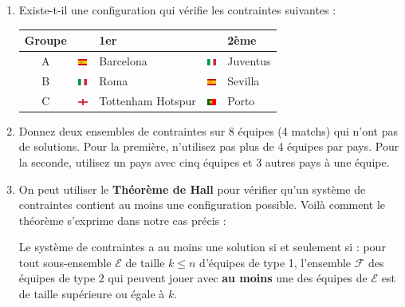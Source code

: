 \documentclass{../ficheTDTP}
\begin{document}
\begin{enumerate}
\begin{enumerate}
\begin{figure}[ht]
\end{figure}

\item Existe-t-il une configuration qui vérifie les contraintes suivantes :

\begin{tabular}{|c|ll|ll|}
\hline
Groupe & & 1er & & 2ème \\ \hline
A & \includegraphics[height=0.2cm]{flags/es.png} & Barcelona & \includegraphics[height=0.2cm]{flags/it.png} & Juventus \\ \hline
B & \includegraphics[height=0.2cm]{flags/it.png} & Roma & \includegraphics[height=0.2cm]{flags/es.png} & Sevilla \\ \hline
C & \includegraphics[height=0.2cm]{flags/en.png} & Tottenham Hotspur & \includegraphics[height=0.2cm]{flags/po.png} & Porto \\ \hline
\end{tabular}

\item Donnez deux ensembles de contraintes sur 8 équipes (4 matchs) qui n'ont pas de solutions. Pour la première, n'utilisez pas plus de 4 équipes par pays. Pour la seconde, utilisez un pays avec cinq équipes et 3 autres pays à une équipe.

\item On peut utiliser le \textbf{Théorème de Hall} pour vérifier qu'un système de contraintes contient au moins une configuration possible. Voilà comment le théorème s'exprime dans notre cas précis :

Le système de contraintes a au moins une solution si et seulement si : pour tout sous-ensemble $\mathcal{E}$ de taille $k \leq n$ d'équipes de type 1, l'ensemble $\mathcal{F}$ des équipes de type $2$ qui peuvent jouer avec \textbf{au moins} une des équipes de $\mathcal{E}$ est de taille supérieure ou égale à $k$. 


\end{enumerate}
\end{enumerate}
\end{document}

